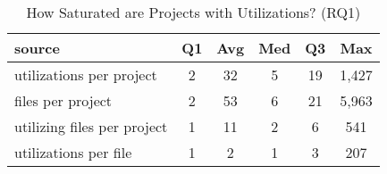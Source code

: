 \begin{table}[tb]
\begin{small}
\begin{center}
\caption{How Saturated are Projects with Utilizations? (RQ1)}
\label{table:saturation}

\begin{tabular}{l|ccccc}
\toprule
source & Q1 & Avg & Med & Q3 & Max \\
\midrule
utilizations per project & 2 & 32 & 5 & 19 & 1,427 \\
\midrule
files per project & 2 & 53 & 6 & 21 & 5,963 \\
\midrule
utilizing files per project & 1 & 11 & 2 & 6 & 541 \\
\midrule
utilizations per file & 1 & 2 & 1 & 3 & 207 \\
\bottomrule
\end{tabular}
\end{center}
\end{small}
\end{table}

